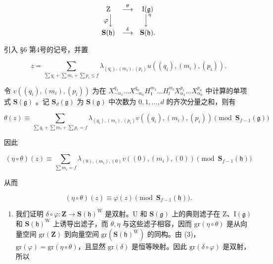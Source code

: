 \[
\begin{array}{c c c} \mathrm{Z} & \stackrel {{\theta}} {{\longrightarrow}} & \mathrm{I} (\mathfrak {g}) \\ \varphi \Big \downarrow & & \Big \downarrow^ {\eta} \\ \mathbf {S} (\mathfrak {h}) & \stackrel {{\delta}} {{\longrightarrow}} & \mathbf {S} (\mathfrak {h}). \end{array}
\]

引入 §6 第4号的记号，并置

\[
z = \sum_ {\sum q _ {i} + \sum m _ {i} + \sum p _ {i} \leq f} \lambda_ {(q _ {i}), (m _ {i}), (p _ {i})} u ((q _ {i}), (m _ {i}), (p _ {i})).
\]

令 \(v((q_i),(m_i),(p_i))\) 为在 \(X_{-\alpha_1}^{q_1}\ldots X_{-\alpha_n}^{q_n}H_1^{m_1}\ldots H_l^{m_l}X_{\alpha_1}^{p_1}\ldots X_{\alpha_n}^{p_n}\) 中计算的单项式 \(\mathbf{S}(\mathfrak{g})\) 。记 \(\mathbf{S}_d(\mathfrak{g})\) 为 \(\mathbf{S}(\mathfrak{g})\) 中次数为 \(0,1,\ldots,d\) 的齐次分量之和，则有

\[
\theta (z) \equiv \sum_ {\sum q _ {i} + \sum m _ {i} + \sum p _ {i} = f} \lambda_ {(q _ {i}), (m _ {i}), (p _ {i})} v ((q _ {i}), (m _ {i}), (p _ {i})) \pmod {\mathbf {S} _ {f - 1} (\mathfrak {g})}
\]

因此

\[
(\eta \circ \theta) (z) \equiv \sum_ {\sum m _ {i} = f} \lambda_ {(0), (m _ {i}), (0)} v ((0), (m _ {i}), (0)) \pmod {\mathbf {S} _ {f - 1} (\mathfrak {h})}
\]

从而

\[
(\eta \circ \theta) (z) \equiv \varphi (z) \pmod {\mathbf {S} _ {f - 1} (\mathfrak {h})}.\tag{3}
\]

\begin{enumerate}
\def\labelenumi{\alph{enumi})}
\setcounter{enumi}{2}
\tightlist
\item
  我们证明 \(\delta \circ \varphi : \mathbf{Z} \to \mathbf{S}(\mathfrak{h})^{\mathrm{W}}\) 是双射。U 和 \(\mathbf{S}(\mathfrak{g})\) 上的典则滤子在 Z、\(\mathrm{I}(\mathfrak{g})\) 和 \(\mathbf{S}(\mathfrak{h})^{\mathrm{W}}\) 上诱导出滤子，而 \(\theta, \eta\) 与这些滤子相容，因而 \(\mathrm{gr}(\eta\circ\theta)\) 是从向量空间 \(\mathrm{gr}(\mathbf{Z})\) 到向量空间 \(\mathrm{gr}(\mathbf{S}(\mathfrak{h})^{\mathrm{W}})\) 的同构。由 (3)，\(\mathrm{gr}(\varphi)=\mathrm{gr}(\eta\circ\theta)\)，且显然 \(\mathrm{gr}(\delta)\) 是恒等映射。因此 \(\mathrm{gr}(\delta\circ\varphi)\) 是双射，所以
\end{enumerate}

